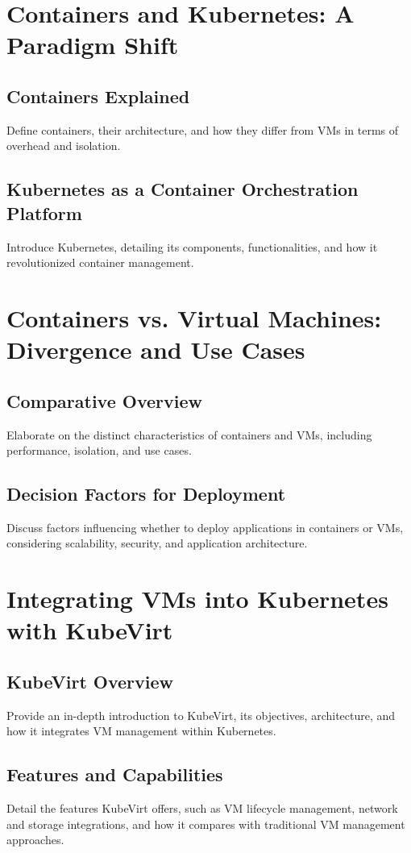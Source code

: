 \documentclass{kththesis}
\begin{document}
\section{Containers and Kubernetes: A Paradigm Shift}
\subsection{Containers Explained}
Define containers, their architecture, and how they differ from VMs in terms of overhead and isolation.
\subsection{Kubernetes as a Container Orchestration Platform}
Introduce Kubernetes, detailing its components, functionalities, and how it revolutionized container management.

\section{Containers vs. Virtual Machines: Divergence and Use Cases}
\subsection{Comparative Overview}
Elaborate on the distinct characteristics of containers and VMs, including performance, isolation, and use cases.
\subsection{Decision Factors for Deployment}
Discuss factors influencing whether to deploy applications in containers or VMs, considering scalability, security, and application architecture.

\section{Integrating VMs into Kubernetes with KubeVirt}
\subsection{KubeVirt Overview}
Provide an in-depth introduction to KubeVirt, its objectives, architecture, and how it integrates VM management within Kubernetes.
\subsection{Features and Capabilities}
Detail the features KubeVirt offers, such as VM lifecycle management, network and storage integrations, and how it compares with traditional VM management approaches.
\end{document}
